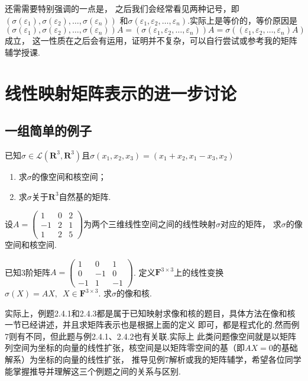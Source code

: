 还需需要特别强调的一点是，
之后我们会经常看见两种记号，即$(\sigma(\varepsilon_1),\sigma(\varepsilon_2),\ldots,\sigma(\varepsilon_n))$
和$\sigma(\varepsilon_1,\varepsilon_2,\ldots,\varepsilon_n)$.实际上是等价的，等价原因是
$(\sigma(\varepsilon_1),\sigma(\varepsilon_2),\ldots,\sigma(\varepsilon_n))A=(\sigma(\varepsilon_1,\varepsilon_2,\ldots,\varepsilon_n))A=\sigma((\varepsilon_1,\varepsilon_2,\ldots,\varepsilon_n)A)$成立，
这一性质在之后会有运用，证明并不复杂，可以自行尝试或参考我的矩阵辅学授课.

\section{线性映射矩阵表示的进一步讨论}
\subsection{一组简单的例子}
\begin{example}\label{example:5:矩阵表示1}
    已知$\sigma \in \mathcal{L}(\mathbf{R}^3,\mathbf{R}^3)$且$\sigma(x_1,x_2,x_3)=(x_1+x_2,x_1-x_3, x_2)$
    \begin{enumerate}[label=(\arabic*)]
        \item 求$\sigma$的像空间和核空间；

        \item 求$\sigma$关于$\mathbf{R}^3$自然基的矩阵.
    \end{enumerate}
\end{example}

\begin{example}\label{ex:6:矩阵表示2}
    设$A=\begin{pmatrix}1 & 0 & 2 \\ -1 & 2 & 1 \\ 1 & 2 & 5\end{pmatrix}$为两个三维线性空间之间的线性映射$\sigma$对应的矩阵，
    求$\sigma$的像空间和核空间.
\end{example}

\begin{example}\label{ex:6:矩阵表示3}
    已知3阶矩阵$A=\begin{pmatrix}
        1 & 0 & 1 \\ 0 & -1 & 0 \\ -1 & 1 & -1
    \end{pmatrix}$. 定义$\mathbf{F}^{3 \times 3}$上的线性变换$\sigma(X)=AX,\enspace X \in \mathbf{F}^{3 \times 3}$.
    求$\sigma$的像和核.
\end{example}
实际上，例题2.4.1和2.4.3都是属于已知映射求像和核的题目，具体方法在像和核一节已经讲述，并且求矩阵表示也是根据上面的定义
即可，都是程式化的.然而例7则有不同，但此题与例2.4.1、2.4.2也有关联.实际上
此类问题像空间就是以矩阵列空间为坐标的向量的线性扩张，核空间是以矩阵零空间的基（即$AX=0$的基础解系）为坐标的向量的线性扩张，
推导见例7解析或我的矩阵辅学，希望各位同学能掌握推导并理解这三个例题之间的关系与区别. %

